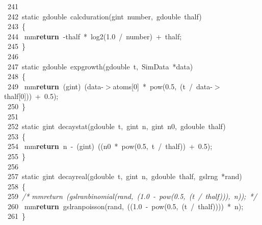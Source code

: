 \documentclass[10pt,a4paper]{article}
\newcommand{\hlstd}[1]{\textcolor[rgb]{0,0,0}{#1}}
\newcommand{\hlkey}[1]{\textcolor[rgb]{0,0,0}{\bf{#1}}}
\newcommand{\hlnum}[1]{\textcolor[rgb]{0.16,0.16,1}{#1}}
\newcommand{\hltyp}[1]{\textcolor[rgb]{0.51,0,0}{#1}}
\newcommand{\hlcom}[1]{\textcolor[rgb]{0.51,0.51,0.51}{\it{#1}}}
\newcommand{\hlline}[1]{\textcolor[rgb]{0.33,0.33,0.33}{#1}}
\begin{document}
{}\hlline{\ 241\ }\hlstd{\\
}\hlline{\ 242\ }\hlstd{}\hltyp{static\ }\hlstd{gdouble\ calc\textunderscore duration(gint\ number,\ gdouble\ thalf)\\
}\hlline{\ 243\ }\hlstd{\{\\
}\hlline{\ 244\ }\hlstd{\hlstd{ mm}}\hlkey{return\ }\hlstd{-thalf\ *\ log2(}\hlnum{1.0\ }\hlstd{/\ number)\ +\ thalf;\\
}\hlline{\ 245\ }\hlstd{\}\\
}\hlline{\ 246\ }\hlstd{\\
}\hlline{\ 247\ }\hlstd{}\hltyp{static\ }\hlstd{gdouble\ exp\textunderscore growth(gdouble\ t,\ SimData\ *data)\\
}\hlline{\ 248\ }\hlstd{\{\\
}\hlline{\ 249\ }\hlstd{\hlstd{ mm}}\hlkey{return\ }\hlstd{(gint)\ (data-$>$atoms[}\hlnum{0}\hlstd{]\ *\ pow(}\hlnum{0.5}\hlstd{,\ (t\ /\ data-$>$thalf[}\hlnum{0}\hlstd{]))\ +\ }\hlnum{0.5}\hlstd{);\\
}\hlline{\ 250\ }\hlstd{\}\\
}\hlline{\ 251\ }\hlstd{\\
}\hlline{\ 252\ }\hlstd{}\hltyp{static\ }\hlstd{gint\ decay\textunderscore stat(gdouble\ t,\ gint\ n,\ gint\ n0,\ gdouble\ thalf)\\
}\hlline{\ 253\ }\hlstd{\{\\
}\hlline{\ 254\ }\hlstd{\hlstd{ mm}}\hlkey{return\ }\hlstd{n\ -\ (gint)\ ((n0\ *\ pow(}\hlnum{0.5}\hlstd{,\ t\ /\ thalf))\ +\ }\hlnum{0.5}\hlstd{);\\
}\hlline{\ 255\ }\hlstd{\}\\
}\hlline{\ 256\ }\hlstd{\\
}\hlline{\ 257\ }\hlstd{}\hltyp{static\ }\hlstd{gint\ decay\textunderscore real(gdouble\ t,\ gint\ n,\ gdouble\ thalf,\ gsl\textunderscore rng\ *rand)\\
}\hlline{\ 258\ }\hlstd{\{\\
}\hlline{\ 259\ }\hlstd{}\hlcom{/*\hlstd{ mm}return\ (gsl\textunderscore ran\textunderscore binomial(rand,\ (1.0\ -\ pow(0.5,\ (t\ /\ thalf))),\ n));\ */}\hlstd{\\
}\hlline{\ 260\ }\hlstd{\hlstd{ mm}}\hlkey{return\ }\hlstd{gsl\textunderscore ran\textunderscore poisson(rand,\ ((}\hlnum{1.0\ }\hlstd{-\ pow(}\hlnum{0.5}\hlstd{,\ (t\ /\ thalf))))\ *\ n);\\
}\hlline{\ 261\ }\hlstd{\}}\mbox{}\\
\normalfont
\end{document}
